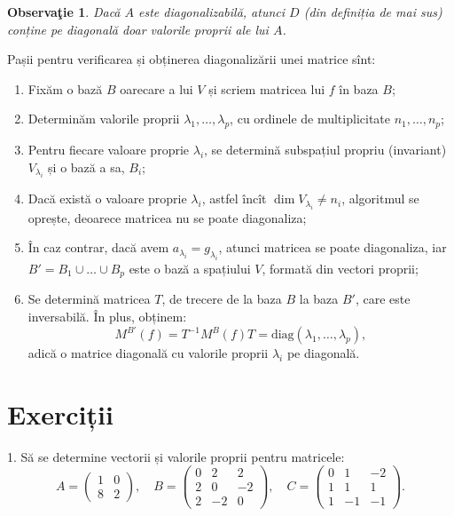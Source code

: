 \documentclass[11pt,a4paper]{article}
\theoremstyle{dotless}
\theoremstyle{dotlessdr}
\newtheorem{remark}{Observa\c{t}ie}[section]
\begin{document}
\begin{remark}\label{rk:diag-vvp}
  Dacă $A$ este diagonalizabilă, atunci $D$ (din definiția de mai sus) conține pe
  diagonală doar valorile proprii ale lui $A$.
\end{remark}

Pașii pentru verificarea și obținerea diagonalizării unei matrice sînt:
\begin{enumerate}[(1)]
\item Fixăm o bază $B$ oarecare a lui $V$ și scriem matricea lui $f$ în
  baza $B$;
\item Determinăm valorile proprii $\lambda_1, \dots, \lambda_p$, cu ordinele
  de multiplicitate $n_1, \dots, n_p$;
\item Pentru fiecare valoare proprie $\lambda_i$, se determină subspațiul propriu
  (invariant) $V_{\lambda_i}$ și o bază a sa, $B_i$;
\item Dacă există o valoare proprie $\lambda_i$, astfel încît
  $\dim V_{\lambda_i} \neq n_i$, algoritmul se oprește, deoarece matricea nu
  se poate diagonaliza;
\item În caz contrar, dacă avem $a_{\lambda_i} = g_{\lambda_i}$, atunci
  matricea se poate diagonaliza, iar $B' = B_1 \cup \dots \cup B_p$ este
  o bază a spațiului $V$, formată din vectori proprii;
\item Se determină matricea $T$, de trecere de la baza $B$ la baza $B'$, care
  este inversabilă. În plus, obținem:
  \[
    M^{B'}(f) = T^{-1} M^B(f) T = \mathrm{diag}(\lambda_1, \dots, \lambda_p),
  \]
  adică o matrice diagonală cu valorile proprii $\lambda_i$ pe diagonală.
\end{enumerate}



\section{Exerciții}
\label{sec:exc}

1. Să se determine vectorii și valorile proprii pentru matricele:
\[
  A = \begin{pmatrix}
    1 & 0 \\
    8 & 2
  \end{pmatrix}, \quad
  B = \begin{pmatrix}
    0 & 2 & 2 \\
    2 & 0 & -2 \\
    2 & -2 & 0
  \end{pmatrix}, \quad
  C = \begin{pmatrix}
    0 & 1 & -2 \\
    1 & 1 & 1 \\
    1 & -1 & -1
  \end{pmatrix}.
\]
\end{document}
